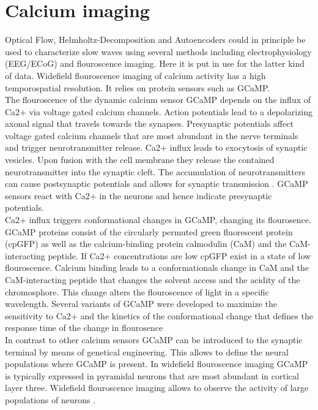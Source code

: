 \section{Calcium imaging}
Optical Flow, Helmholtz-Decomposition and Autoencoders could in principle be used to characterize slow waves using several methods including electrophysiology (EEG/ECoG) and flouroscence imaging. Here it is put in use for the latter kind of data. Widefield flouroscence imaging of calcium activity has a high temporospatial resolution. It relies on protein sensors such as GCaMP.\\
The flouroscence of the dynamic calcium sensor GCaMP depends on the influx of Ca2+ via voltage gated calcium channels. Action potentials lead to a depolarizing axonal signal that travels towards the synapses. Presynaptic potentials affect voltage gated calcium channels that are most abundant in the nerve terminals and trigger neurotransmitter release. Ca2+ influx leads to exocytosis of synaptic vesicles. Upon fusion with the cell membrane they release the contained neurotransmitter into the synaptic cleft. The accumulation of neurotransmitters can cause postsynaptic potentials and allows for synaptic transmission \parencite{sudhof2012calcium}. GCaMP sensors react with Ca2+ in the neurons and hence indicate presynaptic potentials.\\
Ca2+ influx triggers conformational changes in GCaMP, changing its flourosence. GCaMP proteins consist of the circularly permuted green fluorescent protein (cpGFP) as well as the calcium-binding protein calmodulin (CaM) and the CaM-interacting peptide. If Ca2+ concentrations are low cpGFP exist in a state of low flouroscence. Calcium binding leads to a conformationals change in CaM and the CaM-interacting peptide that changes the solvent access and the acidity of the chromosphore. This change alters the flouroscence of light in a specific wavelength. Several variants of GCaMP were developed to maximize the sensitivity to Ca2+ and the kinetics of the conformational change that defines the response time of the change in flourosence \parencite{chen2013ultrasensitive}\\
In contrast to other calcium sensors GCaMP can be introduced to the synaptic terminal by means of genetical engineering. This allows to define the neural populations where GCaMP is present. In widefield flouroscence imaging GCaMP is typically expressed in pyramidal neurons that are most abundant in cortical layer three. Widefield flouroscence imaging allows to observe the activity of large populations of neurons \parencite{chen2013ultrasensitive}.

